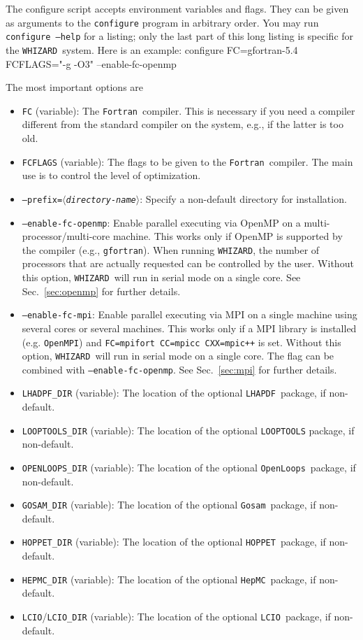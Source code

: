 \documentclass[12pt]{book}
\newenvironment{interaction}%
  {\begingroup\small
   \Verbatim}%
  {\endVerbatim
   \endgroup\noindent}
\newcommand{\var}[1]{$\langle$\textit{#1}$\rangle$}
\newcommand{\ttt}[1]{\texttt{#1}}
\newcommand{\whizard}{\ttt{WHIZARD}}
\newcommand{\lcio}{\ttt{LCIO}}
\newcommand{\lhapdf}{\ttt{LHAPDF}}
\newcommand{\hepmc}{\ttt{HepMC}}
\newcommand{\hoppet}{\ttt{HOPPET}}
\newcommand{\gosam}{\ttt{Gosam}}
\newcommand{\openloops}{\ttt{OpenLoops}}
\newcommand{\fortran}{\ttt{Fortran}}
\begin{document}
The configure script accepts environment variables and flags.  They
can be given as arguments to the \ttt{configure} program in arbitrary
order.  You may run \ttt{configure --help} for a listing; only the
last part of this long listing is specific for the \whizard\ system.
Here is an example:
\begin{interaction}
  configure  FC=gfortran-5.4  FCFLAGS="-g -O3"  --enable-fc-openmp
\end{interaction}

The most important options are
\begin{itemize}
\item
  \ttt{FC} (variable): The \fortran\ compiler.  This is necessary if
  you need a compiler different from the standard compiler on the
  system, e.g., if the latter is too old.
\item
  \ttt{FCFLAGS} (variable): The flags to be given to the \fortran\
  compiler.  The main use is to control the level of optimization.
\item
  \ttt{--prefix=\var{directory-name}}: Specify a non-default directory
  for installation.
\item
  \ttt{--enable-fc-openmp}: Enable parallel executing via OpenMP on a
  multi-processor/multi-core machine.  This works only if OpenMP is
  supported by the compiler (e.g., \ttt{gfortran}).  When running
  \whizard, the number of processors that are actually requested can
  be controlled by the user.  Without this option, \whizard\ will run
  in serial mode on a single core.  See Sec.~\ref{sec:openmp} for
  further details.
\item
  \ttt{--enable-fc-mpi}: Enable parallel executing via MPI on a single
  machine using several cores or several machines. This works only if a MPI
  library is installed (e.g. \ttt{OpenMPI}) and \ttt{FC=mpifort CC=mpicc CXX=mpic++} is
  set. Without this option, \whizard\ will run in serial mode on a single core.
  The flag can be combined with \ttt{--enable-fc-openmp}. See Sec.~\ref{sec:mpi}
  for further details.
\item
  \ttt{LHADPF\_DIR} (variable): The location of the optional \lhapdf\
  package, if non-default.
\item
  \ttt{LOOPTOOLS\_DIR} (variable): The location of the optional \ttt{LOOPTOOLS}
  package, if non-default.
\item
  \ttt{OPENLOOPS\_DIR} (variable): The location of the optional \openloops\
  package, if non-default.
\item
  \ttt{GOSAM\_DIR} (variable): The location of the optional \gosam\
  package, if non-default.
\item
  \ttt{HOPPET\_DIR} (variable): The location of the optional \hoppet\
  package, if non-default.
\item
  \ttt{HEPMC\_DIR} (variable): The location of the optional \hepmc\ package, if
  non-default.
\item
  \ttt{LCIO}/\ttt{LCIO\_DIR} (variable): The location of the optional
  \lcio\ package, if non-default.
\end{itemize}
\end{document}

